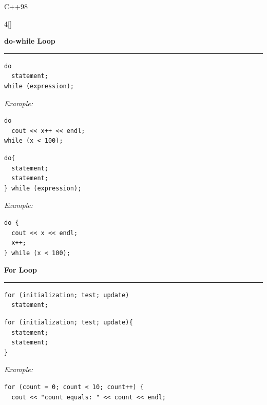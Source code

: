 \documentclass[final]{beamer}
\renewcommand{\subsection}[1]{%
  \par\vspace{1em}%
  {\noindent\large\bfseries #1\par}%
  \vspace{0.5em}\hrule\vspace{1em}%
}
\begin{document}
\begin{frame}[t,fragile]{C++98}
\begin{multicols}{4}[\setlength{\columnsep}{1.5cm}]

\subsection{do-while Loop}
\begin{lstlisting}
do
  statement;
while (expression);
\end{lstlisting}
{\it Example:}
\begin{lstlisting}
do
  cout << x++ << endl;
while (x < 100);
\end{lstlisting}
\begin{lstlisting}
do{
  statement;
  statement;
} while (expression);
\end{lstlisting}
{\it Example:}
\begin{lstlisting}
do {
  cout << x << endl;
  x++;
} while (x < 100);
\end{lstlisting}


\subsection{For Loop}



\begin{lstlisting}
for (initialization; test; update)
  statement;
\end{lstlisting}

\begin{lstlisting}
for (initialization; test; update){
  statement;
  statement;
}
\end{lstlisting}




{\it Example:}

\begin{lstlisting}
for (count = 0; count < 10; count++) {
  cout << "count equals: " << count << endl;
  

\end{lstlisting}
\end{multicols}
\end{frame}
\end{document}
